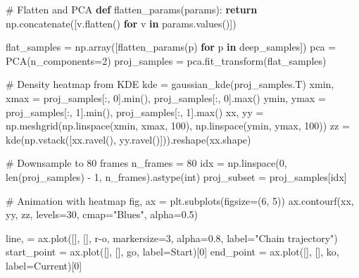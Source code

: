 \documentclass[
  letterpaper,
  numbers=noenddot,
  DIV=11]{scrreprt}
\newenvironment{Shaded}{\begin{snugshade}}{\end{snugshade}}
\newcommand{\BuiltInTok}[1]{\textcolor[rgb]{0.00,0.23,0.31}{#1}}
\newcommand{\CommentTok}[1]{\textcolor[rgb]{0.37,0.37,0.37}{#1}}
\newcommand{\ControlFlowTok}[1]{\textcolor[rgb]{0.00,0.23,0.31}{\textbf{#1}}}
\newcommand{\DecValTok}[1]{\textcolor[rgb]{0.68,0.00,0.00}{#1}}
\newcommand{\FloatTok}[1]{\textcolor[rgb]{0.68,0.00,0.00}{#1}}
\newcommand{\KeywordTok}[1]{\textcolor[rgb]{0.00,0.23,0.31}{\textbf{#1}}}
\newcommand{\NormalTok}[1]{\textcolor[rgb]{0.00,0.23,0.31}{#1}}
\newcommand{\OperatorTok}[1]{\textcolor[rgb]{0.37,0.37,0.37}{#1}}
\newcommand{\StringTok}[1]{\textcolor[rgb]{0.13,0.47,0.30}{#1}}
\theoremstyle{plain}
\theoremstyle{definition}
\theoremstyle{remark}
\begin{document}
\begin{Shaded}
\begin{Highlighting}[numbers=left,,]
\CommentTok{\# Flatten and PCA}
\KeywordTok{def}\NormalTok{ flatten\_params(params):}
    \ControlFlowTok{return}\NormalTok{ np.concatenate([v.flatten() }\ControlFlowTok{for}\NormalTok{ v }\KeywordTok{in}\NormalTok{ params.values()])}

\NormalTok{flat\_samples }\OperatorTok{=}\NormalTok{ np.array([flatten\_params(p) }\ControlFlowTok{for}\NormalTok{ p }\KeywordTok{in}\NormalTok{ deep\_samples])}
\NormalTok{pca }\OperatorTok{=}\NormalTok{ PCA(n\_components}\OperatorTok{=}\DecValTok{2}\NormalTok{)}
\NormalTok{proj\_samples }\OperatorTok{=}\NormalTok{ pca.fit\_transform(flat\_samples)}

\CommentTok{\# Density heatmap from KDE}
\NormalTok{kde }\OperatorTok{=}\NormalTok{ gaussian\_kde(proj\_samples.T)}
\NormalTok{xmin, xmax }\OperatorTok{=}\NormalTok{ proj\_samples[:, }\DecValTok{0}\NormalTok{].}\BuiltInTok{min}\NormalTok{(), proj\_samples[:, }\DecValTok{0}\NormalTok{].}\BuiltInTok{max}\NormalTok{()}
\NormalTok{ymin, ymax }\OperatorTok{=}\NormalTok{ proj\_samples[:, }\DecValTok{1}\NormalTok{].}\BuiltInTok{min}\NormalTok{(), proj\_samples[:, }\DecValTok{1}\NormalTok{].}\BuiltInTok{max}\NormalTok{()}
\NormalTok{xx, yy }\OperatorTok{=}\NormalTok{ np.meshgrid(np.linspace(xmin, xmax, }\DecValTok{100}\NormalTok{), np.linspace(ymin, ymax, }\DecValTok{100}\NormalTok{))}
\NormalTok{zz }\OperatorTok{=}\NormalTok{ kde(np.vstack([xx.ravel(), yy.ravel()])).reshape(xx.shape)}

\CommentTok{\# Downsample to 80 frames}
\NormalTok{n\_frames }\OperatorTok{=} \DecValTok{80}
\NormalTok{idx }\OperatorTok{=}\NormalTok{ np.linspace(}\DecValTok{0}\NormalTok{, }\BuiltInTok{len}\NormalTok{(proj\_samples) }\OperatorTok{{-}} \DecValTok{1}\NormalTok{, n\_frames).astype(}\BuiltInTok{int}\NormalTok{)}
\NormalTok{proj\_subset }\OperatorTok{=}\NormalTok{ proj\_samples[idx]}

\CommentTok{\# Animation with heatmap}
\NormalTok{fig, ax }\OperatorTok{=}\NormalTok{ plt.subplots(figsize}\OperatorTok{=}\NormalTok{(}\DecValTok{6}\NormalTok{, }\DecValTok{5}\NormalTok{))}
\NormalTok{ax.contourf(xx, yy, zz, levels}\OperatorTok{=}\DecValTok{30}\NormalTok{, cmap}\OperatorTok{=}\StringTok{"Blues"}\NormalTok{, alpha}\OperatorTok{=}\FloatTok{0.5}\NormalTok{)}

\NormalTok{line, }\OperatorTok{=}\NormalTok{ ax.plot([], [], }\StringTok{\textquotesingle{}r{-}o\textquotesingle{}}\NormalTok{, markersize}\OperatorTok{=}\DecValTok{3}\NormalTok{, alpha}\OperatorTok{=}\FloatTok{0.8}\NormalTok{, label}\OperatorTok{=}\StringTok{"Chain trajectory"}\NormalTok{)}
\NormalTok{start\_point }\OperatorTok{=}\NormalTok{ ax.plot([], [], }\StringTok{\textquotesingle{}go\textquotesingle{}}\NormalTok{, label}\OperatorTok{=}\StringTok{\textquotesingle{}Start\textquotesingle{}}\NormalTok{)[}\DecValTok{0}\NormalTok{]}
\NormalTok{end\_point }\OperatorTok{=}\NormalTok{ ax.plot([], [], }\StringTok{\textquotesingle{}ko\textquotesingle{}}\NormalTok{, label}\OperatorTok{=}\StringTok{\textquotesingle{}Current\textquotesingle{}}\NormalTok{)[}\DecValTok{0}\NormalTok{]}


\end{Highlighting}
\end{Shaded}
\end{document}
